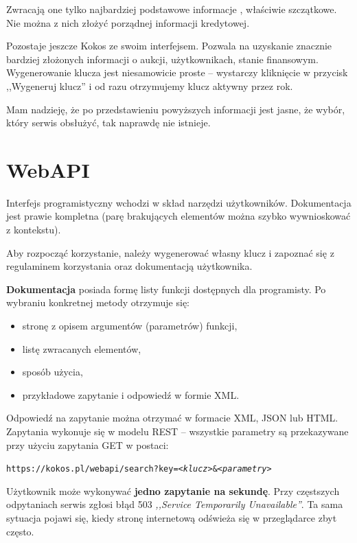 \documentclass[a4paper,twoside,titlepage,openright]{book}
\begin{document}
Zwracają one tylko najbardziej podstawowe informacje \cite{zakraPlApi}, właściwie szczątkowe. Nie można z nich złożyć porządnej informacji kredytowej.

Pozostaje jeszcze Kokos ze swoim interfejsem. Pozwala na uzyskanie znacznie bardziej złożonych informacji o aukcji, użytkownikach, stanie finansowym. Wygenerowanie klucza jest niesamowicie proste -- wystarczy kliknięcie w przycisk ,,Wygeneruj klucz'' i od razu otrzymujemy klucz aktywny przez rok. 

Mam nadzieję, że po przedstawieniu powyższych informacji jest jasne, że wybór, który serwis obsłużyć, tak naprawdę nie istnieje.

\section{WebAPI}

Interfejs programistyczny wchodzi w skład narzędzi użytkowników. Dokumentacja \cite{kokosPlApi} jest prawie kompletna (parę brakujących elementów można szybko wywnioskować z kontekstu). 

Aby rozpocząć korzystanie, należy wygenerować własny klucz i zapoznać się z regulaminem korzystania oraz dokumentacją użytkownika. 

\textbf{Dokumentacja} posiada formę listy funkcji dostępnych dla programisty. Po wybraniu konkretnej metody otrzymuje się:

\begin{itemize}
\item stronę z opisem argumentów (parametrów) funkcji,
\item listę zwracanych elementów,
\item sposób użycia, 
\item przykładowe zapytanie i odpowiedź w formie XML.
\end{itemize}

Odpowiedź na zapytanie można otrzymać w formacie XML, JSON lub HTML. Zapytania wykonuje się w modelu REST -- wszystkie parametry są przekazywane przy użyciu zapytania GET w postaci:  

\begin{center}
\texttt{https://kokos.pl/webapi/search?key=\textit{<klucz>}\&\textit{<parametry>}}
\end{center}

Użytkownik może wykonywać \textbf{jedno zapytanie na sekundę}. Przy częstszych odpytaniach serwis zgłosi błąd 503 \textit{,,Service Temporarily Unavailable''}. Ta sama sytuacja pojawi się, kiedy stronę internetową odświeża się w przeglądarce zbyt często. 
\end{document}
